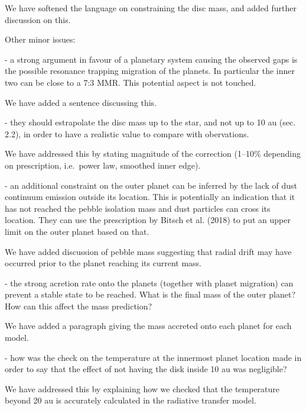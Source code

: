\documentclass{article}
\begin{document}
{\color{blue}
   We have softened the language on constraining the disc mass, and added
   further discussion on this.
}

Other minor issues:

- a strong argument in favour of a planetary system causing the observed gaps is
the possible resonance trapping migration of the planets. In particular the
inner two can be close to a 7:3 MMR\@. This potential aspect is not touched.

{\color{blue}
   We have added a sentence discussing this.
}

- they should estrapolate the disc mass up to the star, and not up to 10 au
(sec. 2.2), in order to have a realistic value to compare with obervations.

{\color{blue}
   We have addressed this by stating magnitude of the correction (1--10\%
   depending on prescription, i.e.\ power law, smoothed inner edge).
}

- an additional constraint on the outer planet can be inferred by the lack of
dust continuum emission outside its location. This is potentially an indication
that it has not reached the pebble isolation mass and dust particles can cross
its location. They can use the prescription by Bitsch et al. (2018) to put an
upper limit on the outer planet based on that.

{\color{blue}
   We have added discussion of pebble mass suggesting that radial drift may have
   occurred prior to the planet reaching its current mass.
}

- the strong acretion rate onto the planets (together with planet migration) can
prevent a stable state to be reached. What is the final mass of the outer
planet? How can this affect the mass prediction?

{\color{blue}
   We have added a paragraph giving the mass accreted onto each planet for each
   model.
}

- how was the check on the temperature at the innermost planet location made in
order to say that the effect of not having the disk inside 10 au was negligible?

{\color{blue}
   We have addressed this by explaining how we checked that the temperature
   beyond 20 au is accurately calculated in the radiative transfer model.
}
\end{document}

